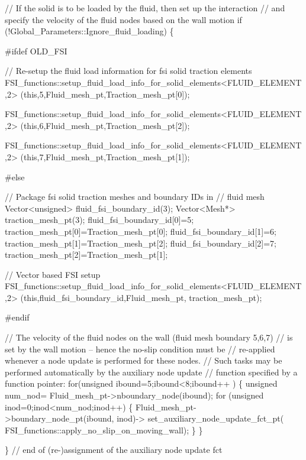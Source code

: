 \begin{DoxyCodeInclude}

 \textcolor{comment}{// If the solid is to be loaded by the fluid, then set up the interaction}
 \textcolor{comment}{// and specify the velocity of the fluid nodes based on the wall motion}
 \textcolor{keywordflow}{if} (!Global\_Parameters::Ignore\_fluid\_loading)
  \{

\textcolor{preprocessor}{#ifdef OLD\_FSI}

   \textcolor{comment}{// Re-setup the fluid load information for fsi solid traction elements}
   FSI\_functions::setup\_fluid\_load\_info\_for\_solid\_elements<FLUID\_ELEMENT,2>
    (\textcolor{keyword}{this},5,Fluid\_mesh\_pt,Traction\_mesh\_pt[0]); 

   FSI\_functions::setup\_fluid\_load\_info\_for\_solid\_elements<FLUID\_ELEMENT,2>
    (\textcolor{keyword}{this},6,Fluid\_mesh\_pt,Traction\_mesh\_pt[2]); 

   FSI\_functions::setup\_fluid\_load\_info\_for\_solid\_elements<FLUID\_ELEMENT,2>
    (\textcolor{keyword}{this},7,Fluid\_mesh\_pt,Traction\_mesh\_pt[1]); 

\textcolor{preprocessor}{#else}

   \textcolor{comment}{// Package fsi solid traction meshes and boundary IDs in }
   \textcolor{comment}{// fluid mesh}
   Vector<unsigned> fluid\_fsi\_boundary\_id(3);
   Vector<Mesh*> traction\_mesh\_pt(3);
   fluid\_fsi\_boundary\_id[0]=5;
   traction\_mesh\_pt[0]=Traction\_mesh\_pt[0];
   fluid\_fsi\_boundary\_id[1]=6;
   traction\_mesh\_pt[1]=Traction\_mesh\_pt[2];
   fluid\_fsi\_boundary\_id[2]=7;
   traction\_mesh\_pt[2]=Traction\_mesh\_pt[1];
   
   \textcolor{comment}{// Vector based FSI setup}
   FSI\_functions::setup\_fluid\_load\_info\_for\_solid\_elements<FLUID\_ELEMENT,2>
    (\textcolor{keyword}{this},fluid\_fsi\_boundary\_id,Fluid\_mesh\_pt,
     traction\_mesh\_pt);

\textcolor{preprocessor}{#endif}

   \textcolor{comment}{// The velocity of the fluid nodes on the wall (fluid mesh boundary 5,6,7)}
   \textcolor{comment}{// is set by the wall motion -- hence the no-slip condition must be}
   \textcolor{comment}{// re-applied whenever a node update is performed for these nodes. }
   \textcolor{comment}{// Such tasks may be performed automatically by the auxiliary node update }
   \textcolor{comment}{// function specified by a function pointer:}
   \textcolor{keywordflow}{for}(\textcolor{keywordtype}{unsigned} ibound=5;ibound<8;ibound++ )
    \{ 
     \textcolor{keywordtype}{unsigned} num\_nod= Fluid\_mesh\_pt->nboundary\_node(ibound);
     \textcolor{keywordflow}{for} (\textcolor{keywordtype}{unsigned} inod=0;inod<num\_nod;inod++)
      \{   
       Fluid\_mesh\_pt->boundary\_node\_pt(ibound, inod)->
        set\_auxiliary\_node\_update\_fct\_pt(
         FSI\_functions::apply\_no\_slip\_on\_moving\_wall);
      \}
    \}

  \} \textcolor{comment}{// end of (re-)assignment of the auxiliary node update fct}

\end{DoxyCodeInclude}


